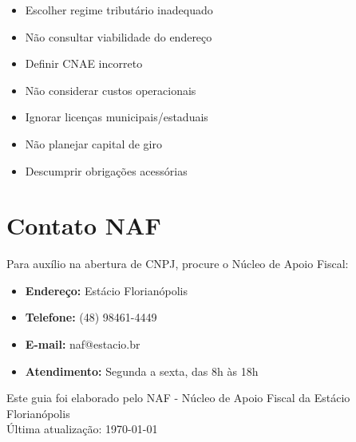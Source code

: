 \documentclass[12pt,a4paper]{article}
\begin{document}
\begin{itemize}
    \item Escolher regime tributário inadequado
    \item Não consultar viabilidade do endereço
    \item Definir CNAE incorreto
    \item Não considerar custos operacionais
    \item Ignorar licenças municipais/estaduais
    \item Não planejar capital de giro
    \item Descumprir obrigações acessórias
\end{itemize}

\section{Contato NAF}

Para auxílio na abertura de CNPJ, procure o Núcleo de Apoio Fiscal:

\begin{itemize}
    \item \textbf{Endereço:} Estácio Florianópolis
    \item \textbf{Telefone:} (48) 98461-4449
    \item \textbf{E-mail:} naf@estacio.br
    \item \textbf{Atendimento:} Segunda a sexta, das 8h às 18h
\end{itemize}

\vfill
\begin{center}
\footnotesize
Este guia foi elaborado pelo NAF - Núcleo de Apoio Fiscal da Estácio Florianópolis\\
Última atualização: \today
\end{center}
\end{document}
